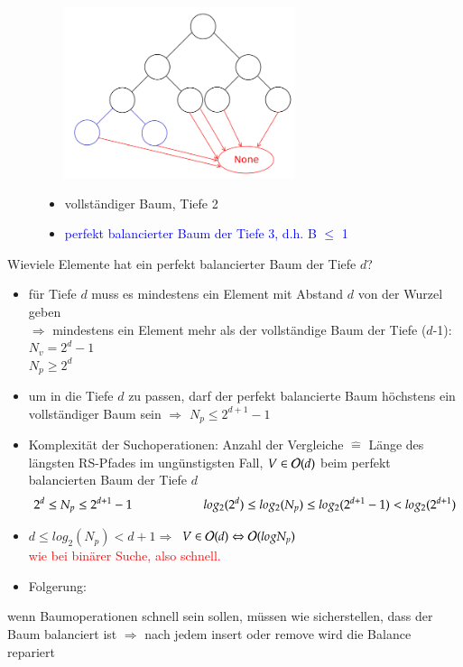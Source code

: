 \begin{figure}[htbp]
    \begin{minipage}[t]{8cm}
        \vspace{0pt}
        \centering
        \includegraphics[width=8cm,height=5cm,keepaspectratio]{./Pictures/BalanBaum.png}
    \end{minipage}
    \begin{minipage}[t]{6cm}
        \vspace{1cm}
        \begin{itemize}
            \item vollständiger Baum, Tiefe 2
            \item \textcolor{blue}{perfekt balancierter Baum der Tiefe 3, d.h. B $\leq$ 1}
        \end{itemize}
    \end{minipage}
\end{figure}

Wieviele Elemente hat ein perfekt balancierter Baum der Tiefe $d$?
\begin{itemize}
    \item für Tiefe $d$ muss es mindestens ein Element mit Abstand $d$ von der Wurzel geben \\
    $\Rightarrow$ mindestens ein Element mehr als der vollständige Baum der Tiefe ($d$-1): $N_v = 2^d -1$\\
    $N_p \geq 2^d$
    \item um in die Tiefe $d$ zu passen, darf der perfekt balancierte Baum höchstens ein vollständiger Baum sein $\Rightarrow$ $N_p \leq 2^{d+1} -1$
\end{itemize}
\begin{itemize}[label={$\Rightarrow$}]
    \item Komplexität der Suchoperationen: Anzahl der Vergleiche $\widehat{=}$ Länge des längsten RS-Pfades im ungünstigsten Fall, \textcolor{red}{$V \in \mathcal{O}{}(d)$} beim perfekt balancierten Baum der Tiefe $d$ \\
    \[ 2^d \leq N_p \leq 2^{d+1} - 1 \hspace*{2cm} log_2(2^d) \leq log_2(N_p) \leq log_2(2^{d+1}-1) < log_2(2^{d+1})\]
    \item $d\leq log_2(N_p) < d + 1 \Rightarrow$ \textcolor{red}{$V \in \mathcal{O}{}(d) \Leftrightarrow \mathcal{O}{}(log N_p)$}\\
    \textcolor{red}{wie bei binärer Suche, also schnell.}
    \item Folgerung:
\end{itemize}wenn Baumoperationen schnell sein sollen, müssen wie sicherstellen, dass der Baum balanciert ist $\Rightarrow$ nach jedem insert oder remove wird die Balance \glqq repariert\grqq

